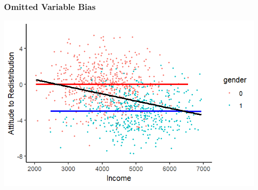 \documentclass[xcolor=x11names,compress]{beamer}\usepackage[]{graphicx}\usepackage[]{color}
\makeatletter
\def\maxwidth{ %
  \ifdim\Gin@nat@width>\linewidth
    \linewidth
  \else
    \Gin@nat@width
  \fi
}
\newenvironment{knitrout}{}{} %
\renewcommand{\(}{\begin{columns}}
\renewcommand{\)}{\end{columns}}
\newcommand{\<}[1]{\begin{column}{#1}}
\renewcommand{\>}{\end{column}}
\makeatother
\begin{document}
\begin{frame}
\frametitle{Omitted Variable Bias}
\begin{knitrout}
\color{fgcolor}
\includegraphics[width=\maxwidth]{figure/confound3-1} 

\end{knitrout}
\end{frame}



\end{document}
